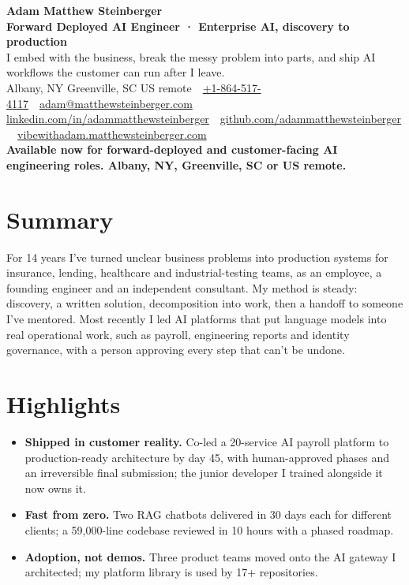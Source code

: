 \documentclass[10pt,letterpaper]{article}
\newcommand{\szname}{\fontsize{20pt}{24pt}\selectfont}
\newcommand{\sztitle}{\fontsize{10.5pt}{13pt}\selectfont}
\newcommand{\szbody}{\fontsize{9pt}{10.8pt}\selectfont}
\newcommand{\szmeta}{\fontsize{8pt}{10pt}\selectfont}
\begin{document}
\color{ink}\szbody

\begin{center}
{\szname\bfseries\color{primary} Adam Matthew Steinberger}\\[3pt]
{\sztitle\bfseries\color{accent} Forward Deployed AI Engineer · Enterprise AI, discovery to production}\\[4pt]
{\szbody I embed with the business, break the messy problem into parts, and ship AI workflows the customer can run after I leave.}\\[6pt]
{\szmeta\color{muted} Albany, NY \textbullet{} Greenville, SC \textbullet{} US remote\ {\color{rulecolor}\textbar}\ \href{tel:+18645174117}{+1-864-517-4117}\ {\color{rulecolor}\textbar}\ \href{mailto:adam@matthewsteinberger.com}{adam@matthewsteinberger.com}}\\[2pt]
{\szmeta\color{muted} \href{https://www.linkedin.com/in/adammatthewsteinberger/}{linkedin.com/in/adammatthewsteinberger}\ {\color{rulecolor}\textbar}\ \href{https://github.com/adammatthewsteinberger}{github.com/adammatthewsteinberger}\ {\color{rulecolor}\textbar}\ \href{https://vibewithadam.matthewsteinberger.com}{vibewithadam.matthewsteinberger.com}}\\[6pt]
{\szbody\bfseries Available now for forward-deployed and customer-facing AI engineering roles. Albany, NY, Greenville, SC or US remote.}
\end{center}
\vspace{-6pt}
\section*{Summary}
For 14 years I've turned unclear business problems into production systems for insurance, lending, healthcare and industrial-testing teams, as an employee, a founding engineer and an independent consultant. My method is steady: discovery, a written solution, decomposition into work, then a handoff to someone I've mentored. Most recently I led AI platforms that put language models into real operational work, such as payroll, engineering reports and identity governance, with a person approving every step that can't be undone.\par
\section*{Highlights}
\begin{itemize}
\item \textbf{Shipped in customer reality.} Co-led a 20-service AI payroll platform to production-ready architecture by day 45, with human-approved phases and an irreversible final submission; the junior developer I trained alongside it now owns it.
\item \textbf{Fast from zero.} Two RAG chatbots delivered in 30 days each for different clients; a 59,000-line codebase reviewed in 10 hours with a phased roadmap.
\item \textbf{Adoption, not demos.} Three product teams moved onto the AI gateway I architected; my platform library is used by 17+ repositories.
\end{itemize}
\end{document}
